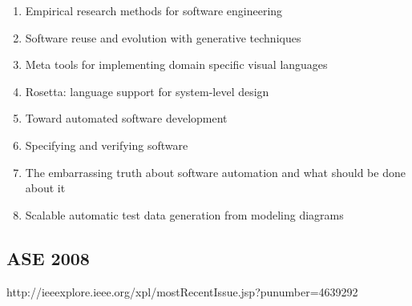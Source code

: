 \begin{enumerate}[itemsep=-1ex]
  \item Empirical research methods for software engineering
  \item Software reuse and evolution with generative techniques
  \item Meta tools for implementing domain specific visual languages
  \item Rosetta: language support for system-level design
  \item Toward automated software development
  \item Specifying and verifying software
  \item The embarrassing truth about software automation and what should be done about it
  \item Scalable automatic test data generation from modeling diagrams
\end{enumerate}

\subsection{ASE 2008}

http://ieeexplore.ieee.org/xpl/mostRecentIssue.jsp?punumber=4639292

